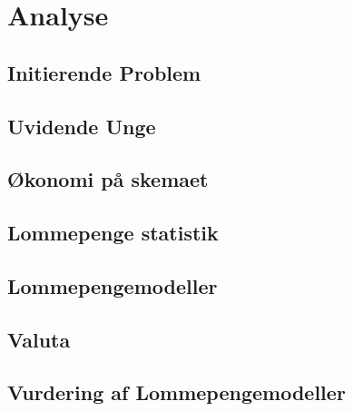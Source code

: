 





\chapter{Analyse}

\section{Initierende Problem}


\section{Uvidende Unge}
\label{UvidendeUnge}


\section{Økonomi på skemaet}


\section{Lommepenge statistik}


\section{Lommepengemodeller}

\section{Valuta}

\section{Vurdering af Lommepengemodeller}



%






